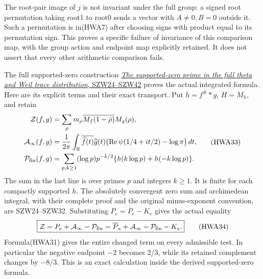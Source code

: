 \documentclass[
  10pt,
  a4paper,
]{article}
\begin{document}
The root-pair image of \(j\) is not invariant under the full group: a
signed root permutation taking root1 to root0 sends a vector with
\(A\ne0,B=0\) outside it. Such a permutation is in(HWA7) after choosing
signs with product equal to its permutation sign. This proves a specific
failure of invariance of this comparison map, with the group action and
endpoint map explicitly retained. It does not assert that every other
arithmetic comparison fails.

The full supported-zero construction
\href{https://github.com/KokunoYumeto/zeta-function-research-reader/blob/adfbfe74fa49e31cb7aa068cf755fb083be37c32/workbenches/splitzero-tandem/branches/tau-zero-prime-positivity/SUPPORTED_ZERO_PRIME_WEIL_DERIVATION.md}{\emph{The
supported-zero prime in the full theta and Weil trace distribution},
SZW24--SZW42} proves the actual integrated formula. Here are its
explicit terms and their exact transport. Put \(h=f^\#*g\), \(H=M_h\),
and retain \[
\begin{aligned}
\mathcal Z(f,g)&=\sum_\rho m_\rho\overline{M_f(1-\bar\rho)}M_g(\rho),\\
\mathcal A_\infty(f,g)&=\frac1{2\pi}\int_{\mathbb R}
\overline{\widehat f(t)}\widehat g(t)
\bigl(\operatorname{Re}\psi(1/4+it/2)-\log\pi\bigr)\,dt,\\
\mathcal P_{\rm fin}(f,g)&=\sum_{p,k\ge1}(\log p)p^{-k/2}
\{h(k\log p)+h(-k\log p)\}.
\end{aligned}
\tag{HWA33}
\] The sum in the last line is over primes \(p\) and integers \(k\ge1\).
It is finite for each compactly supported \(h\). The absolutely
convergent zero sum and archimedean integral, with their complete proof
and the original minus-exponent convention, are SZW24--SZW32.
Substituting \(P_e=\overline P_e-K_e\) gives the actual equality \[
\boxed{\mathcal Z=P_e+\mathcal A_\infty-\mathcal P_{\rm fin}
=\overline P_e+\mathcal A_\infty-\mathcal P_{\rm fin}-K_e.}
\tag{HWA34}
\] Formula(HWA31) gives the entire changed term on every admissible
test. In particular the negative endpoint \(-2\) becomes \(2/3\), while
its retained complement changes by \(-8/3\). This is an exact
calculation inside the derived supported-zero formula.
\end{document}
